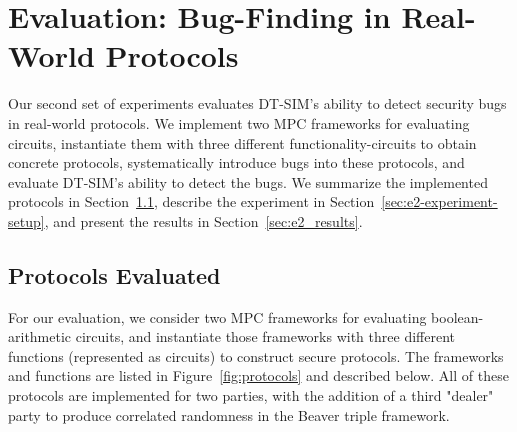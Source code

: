 \documentclass[acmlarge, manuscript, screen, review, anonymous, table]{acmart}
\newcommand{\toolname}{\textsc{DT-SIM}\xspace}
\begin{document}
\section{Evaluation: Bug-Finding in Real-World Protocols}
\label{sec:case-study-protocols}

Our second set of experiments evaluates \toolname's ability to detect security bugs in real-world protocols.
We implement two MPC frameworks for evaluating circuits,
instantiate them with three different functionality-circuits to obtain concrete protocols,
systematically introduce bugs into these protocols,
and evaluate \toolname's ability to detect the bugs.
We summarize the implemented protocols in Section~\ref{sec:protocols-evaluated},
describe the experiment in Section~\ref{sec:e2-experiment-setup},
and present the results in Section~\ref{sec:e2_results}.

\subsection{Protocols Evaluated}
\label{sec:protocols-evaluated}

For our evaluation, we consider two MPC frameworks for evaluating boolean-arithmetic circuits,
and instantiate those frameworks with three different functions (represented as circuits) to construct secure protocols.
The frameworks and functions are listed in Figure~\ref{fig:protocols} and described below.
All of these protocols are implemented for two parties,
with the addition of a third "dealer" party to produce correlated randomness in the Beaver triple framework.
\end{document}
